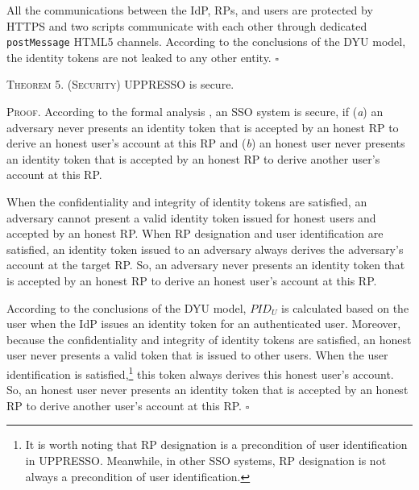 {All the communications between the IdP, RPs, and users are protected by HTTPS
 and two scripts communicate with each other through dedicated \verb+postMessage+ HTML5 channels.
According to the conclusions of the DYU model,
 the identity tokens are not leaked to any other entity. \hfill $\square$


\vspace{1mm}
\noindent\textsc{Theorem 5. (Security)} {UPPRESSO is secure.}

\vspace{0.75mm}
\noindent\textsc{Proof.}
According to the formal analysis \cite{SPRESSO,FettKS14},
    an SSO system is secure, if (\emph{a}) an adversary never presents an identity token that is accepted by an honest RP to derive an honest user's account at this RP
    and (\emph{b}) an honest user never presents an identity token that is accepted by an honest RP to derive another user's account at this RP.


When the confidentiality and integrity of identity tokens are satisfied, an adversary cannot present a valid identity token issued for honest users and accepted by an honest RP.
When RP designation and user identification are satisfied, an identity token issued to an adversary always derives the adversary's account at the target RP.
So, an adversary never presents an identity token that is accepted by an honest RP to derive an honest user's account at this RP.


According to the conclusions of the DYU model, $PID_U$ is calculated based on the user when the IdP issues an identity token for an authenticated user.
Moreover, because the confidentiality and integrity of identity tokens are satisfied, an honest user never presents a valid token that is issued to other users.
When the user identification is satisfied,\footnote{It is worth noting that RP designation is a precondition of user identification in UPPRESSO. Meanwhile, in other SSO systems, RP designation is not always a precondition of user identification.} this token always derives this honest user's account.
So, an honest user never presents an identity token that is accepted by an honest RP to derive another user’s account at this RP.
\hfill $\square$

}
